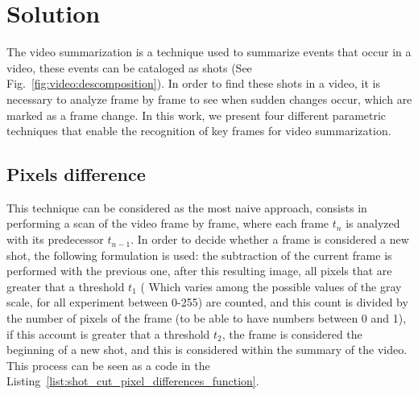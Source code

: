 \documentclass[journal]{IEEEtran}
\begin{document}
\section{Solution}
\label{sec:solution}
The video summarization is a technique used to summarize events that occur in a video, these events can be cataloged as shots (See Fig.~\ref{fig:video:descomposition}). In order to find these shots in a video, it is necessary to analyze frame by frame to see when sudden changes occur, which are marked as a frame change. In this work, we present four different parametric techniques that enable the recognition of key frames for video summarization.

\subsection{Pixels difference}
This technique can be considered as the most naive approach, consists in performing a scan of the video frame by frame, where each frame $t_n$ is analyzed with its predecessor $t_{n-1}$. In order to decide whether a frame is considered a new shot, the following formulation is used: the subtraction of the current frame is performed with the previous one, after this resulting image, all pixels that are greater that a threshold $t_1$ ( Which varies among the possible values of the gray scale, for all experiment between 0-255) are counted, and this count is divided by the number of pixels of the frame (to be able to have numbers between 0 and 1), if this account is greater that a threshold $t_2$, the frame is considered the beginning of a new shot, and this is considered within the summary of the video.  This process can be seen as a code in the Listing~\ref{list:shot_cut_pixel_differences_function}.
\end{document}
